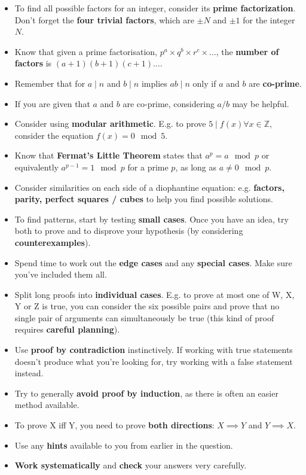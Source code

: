 \documentclass[9pt]{extarticle}
\begin{document}
	\begin{itemize}
		\item To find all possible factors for an integer, consider its \textbf{prime factorization}. Don't forget the \textbf{four trivial factors}, which are $\pm N$ and $\pm 1$ for the integer $N$.
		\item Know that given a prime factorisation, $p^a \times q^b \times r^c \times \dots$, the \textbf{number of factors} is $(a+1)(b+1)(c+1)\dots$.
		\item Remember that for $a \mid n$ and $b \mid n$ implies $ab \mid n$ only if $a$ and $b$ are \textbf{co-prime}.
		\item If you are given that $a$ and $b$ are co-prime, considering $a/b$ may be helpful.
		\item Consider using \textbf{modular arithmetic}. E.g. to prove $5 \mid f(x) \forall x \in \mathbb{Z}$, consider the equation $f(x) = 0 \mod{5}$. 
		\item Know that \textbf{Fermat's Little Theorem} states that $a^p = a \mod{p}$ or equivalently $a^{p-1} = 1 \mod{p}$ for a prime $p$, as long as $a \not= 0 \mod{p}$.
		\item Consider similarities on each side of a diophantine equation: e.g. \textbf{factors, parity, perfect squares / cubes} to help you find possible solutions.
		\item To find patterns, start by testing \textbf{small cases}. Once you have an idea, try both to prove and to disprove your hypothesis (by considering \textbf{counterexamples}).
		\item Spend time to work out the \textbf{edge cases} and any \textbf{special cases}. Make sure you've included them all.
		\item Split long proofs into \textbf{individual cases}. E.g. to prove at most one of W, X, Y or Z is true, you can consider the six possible pairs and prove that no single pair of arguments can simultaneously be true (this kind of proof requires \textbf{careful planning}).
		\item Use \textbf{proof by contradiction} instinctively. If working with true statements doesn't produce what you're looking for, try working with a false statement instead.
		\item Try to generally \textbf{avoid proof by induction}, as there is often an easier method available.
		\item To prove X iff Y, you need to prove \textbf{both directions}: $X \implies Y$ and $Y \implies X$.
		\item Use any \textbf{hints} available to you from earlier in the question.
		\item \textbf{Work systematically} and \textbf{check} your answers very carefully.
	\end{itemize}
\end{document}
